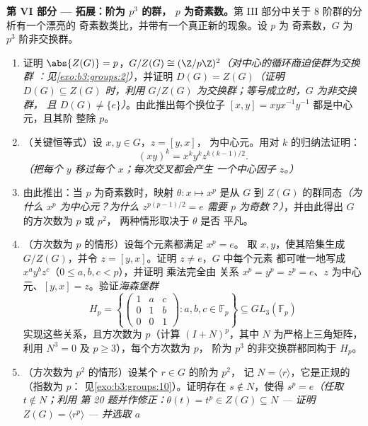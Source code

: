 \begin{problem}
\medskip
\noindent\textbf{第 VI 部分 --- 拓展：阶为 $p^3$ 的群，
$p$ 为奇素数。}第 III 部分中关于 $8$ 阶群的分析有一个漂亮的
奇素数类比，并带有一个真正新的现象。设 $p$ 为
奇素数，$G$ 为 $p^3$ 阶非交换群。
\begin{enumerate}[resume]
  \item 证明 $\abs{Z(G)} = p$，$G/Z(G) \cong
        (\Z/p\Z)^2$\emph{（对中心的循环商迫使群为交换群
        ：见\cref{exo:b3:groups:2}）}，并证明 $D(G) =
        Z(G)$\emph{（证明 $D(G) \subseteq Z(G)$ 时，利用
        $G/Z(G)$ 为交换群；等号成立时，$G$ 为非交换群，
        且 $D(G) \neq \{e\}$）}。由此推出每个换位子
        $[x, y] = xyx^{-1}y^{-1}$ 都是中心元，且其阶
        整除 $p$。
  \item （关键恒等式）设 $x, y \in G$，$z = [y, x]$，
        为中心元。用对 $k$ 的归纳法证明：
        \[
        (xy)^k = x^k y^k z^{k(k-1)/2} .
        \]
        \emph{（把每个 $y$ 移过每个 $x$；每次交叉都会产生
        一个中心因子 $z$。）}
  \item 由此推出：当 $p$ 为奇素数时，映射 $\theta\colon x \mapsto
        x^p$ 是从 $G$ 到 $Z(G)$ 的群同态\emph{（为什么
        $x^p$ 为中心元？为什么 $z^{p(p-1)/2} = e$ 需要 $p$
        为奇数？）}，并由此得出 $G$ 的方次数为 $p$ 或 $p^2$，
        两种情形取决于 $\theta$ 是否
        平凡。
  \item （方次数为 $p$ 的情形）设每个元素都满足 $x^p = e$。
        取 $x, y$，使其陪集生成 $G/Z(G)$，并令 $z =
        [y, x]$。证明 $z \neq e$，$G$ 中每个元素
        都可唯一地写成 $x^ay^bz^c$（$0 \leq a, b, c < p$），并证明
        乘法完全由
        关系 $x^p = y^p = z^p = e$、$z$ 为中心元、$[y, x] =
        z$。验证\emph{海森堡群}
        \[
        H_p = \left\{
        \begin{pmatrix} 1 & a & c\\ 0 & 1 & b\\ 0 & 0 & 1
        \end{pmatrix} : a, b, c \in \mathbb F_p \right\}
        \subseteq GL_3(\mathbb F_p)
        \]
        实现这些关系，且方次数为 $p$（计算
        $(I + N)^p$，其中 $N$ 为严格上三角矩阵，利用
        $N^3 = 0$ 及 $p \geq 3$），每个方次数为 $p$，
        阶为 $p^3$ 的非交换群都同构于 $H_p$。
  \item （方次数为 $p^2$ 的情形）设某个 $r \in G$ 的阶为 $p^2$，
        记 $N = \langle r\rangle$，它是正规的（指数为 $p$：
        见\cref{exo:b3:groups:10}）。证明存在 $s \notin N$，使得
        $s^p = e$\emph{（任取 $t \notin N$；利用
        第 20 题并作修正：$\theta(t) = t^p \in Z(G) \subseteq N$
        --- 证明 $Z(G) = \langle r^p\rangle$ --- 并选取 $a$
}
\end{enumerate}
\end{problem}
